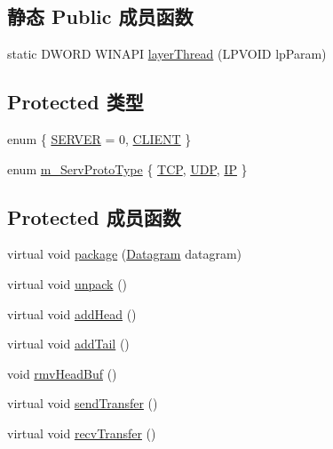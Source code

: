 \subsection*{静态 Public 成员函数}
\begin{DoxyCompactItemize}
\item 
static D\+W\+O\+RD W\+I\+N\+A\+PI \hyperlink{class_c_layer_interface_a59d79b4c294ca20c2a761a4f1f737e24}{layer\+Thread} (L\+P\+V\+O\+ID lp\+Param)
\end{DoxyCompactItemize}
\subsection*{Protected 类型}
\begin{DoxyCompactItemize}
\item 
enum \{ \hyperlink{class_c_layer_interface_a033fd0915604b00e58a68115d414a50aa7eeac76b4b92f888cb8ac9bf1bb05eac}{S\+E\+R\+V\+ER} = 0, 
\hyperlink{class_c_layer_interface_a033fd0915604b00e58a68115d414a50aaca016d45c2bb91af5ffd4a1be97f1cd3}{C\+L\+I\+E\+NT}
 \}
\item 
enum \hyperlink{class_c_layer_interface_abcab6cee3a2b9a396b287124f4204756}{m\+\_\+\+Serv\+Proto\+Type} \{ \hyperlink{class_c_layer_interface_abcab6cee3a2b9a396b287124f4204756afcf9bb4eb22b22ecf8d2192c50e06026}{T\+CP}, 
\hyperlink{class_c_layer_interface_abcab6cee3a2b9a396b287124f4204756ac26954c1ead3d7a4cb6df8d1db2377e1}{U\+DP}, 
\hyperlink{class_c_layer_interface_abcab6cee3a2b9a396b287124f4204756a4f5637cbd0e6bd8f4f5d0198da841c15}{IP}
 \}
\end{DoxyCompactItemize}
\subsection*{Protected 成员函数}
\begin{DoxyCompactItemize}
\item 
virtual void \hyperlink{class_c_layer_interface_a4bde2a0310c9071cbe7020cc38c97674}{package} (\hyperlink{class_datagram}{Datagram} datagram)
\item 
virtual void \hyperlink{class_c_layer_interface_a94cb2e090328df13a252a2ea40db94d8}{unpack} ()
\item 
virtual void \hyperlink{class_c_layer_interface_ac38c51660960657ac42e37a19ea062b4}{add\+Head} ()
\item 
virtual void \hyperlink{class_c_layer_interface_a433a6f3322355291bbfc2b97343d493f}{add\+Tail} ()
\item 
void \hyperlink{class_c_layer_interface_ac98e8ced890a29b4b76e16cfa3defddb}{rmv\+Head\+Buf} ()
\item 
virtual void \hyperlink{class_c_layer_interface_a02a144b97e69df2dc47149e5314cba2d}{send\+Transfer} ()
\item 
virtual void \hyperlink{class_c_layer_interface_aca72cd6ae77b4e4b4c1d058377583110}{recv\+Transfer} ()
\end{DoxyCompactItemize}
